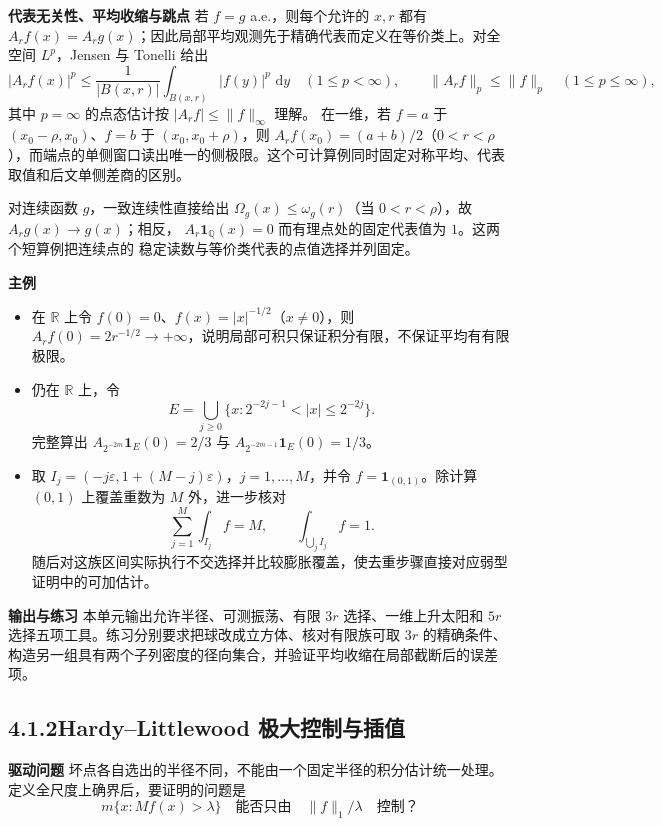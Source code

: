 \documentclass[11pt,a4paper]{ctexart}
\newcommand{\R}{\mathbb R}
\newcommand{\eps}{\varepsilon}
\newcommand{\dd}{\,\mathrm d}
\newcommand{\planitem}[1]{\par\smallskip\noindent\textcolor{deepblue}{\textbf{#1}}\quad}
\newcommand{\unithead}[2]{\subsection{#1\quad #2}}
\begin{document}
\planitem{代表无关性、平均收缩与跳点}
若 $f=g$ a.e.，则每个允许的 $x,r$ 都有 $A_rf(x)=A_rg(x)$；因此局部平均观测先于精确代表而定义在等价类上。对全空间 $L^p$，Jensen 与 Tonelli 给出
\[
 |A_rf(x)|^p\le\frac1{|B(x,r)|}\int_{B(x,r)}|f(y)|^p\,\dd y
 \quad(1\le p<\infty),
 \qquad \|A_rf\|_p\le\|f\|_p\quad(1\le p\le\infty),
\]
其中 $p=\infty$ 的点态估计按 $|A_rf|\le\|f\|_\infty$ 理解。
在一维，若 $f=a$ 于 $(x_0-\rho,x_0)$、$f=b$ 于 $(x_0,x_0+\rho)$，则
$A_rf(x_0)=(a+b)/2$（$0<r<\rho$），而端点的单侧窗口读出唯一的侧极限。这个可计算例同时固定对称平均、代表取值和后文单侧差商的区别。

对连续函数 $g$，一致连续性直接给出
$\Omega_g(x)\le\omega_g(r)$（当 $0<r<\rho$），故 $A_rg(x)\to g(x)$；相反，
$A_r\mathbf1_{\mathbb Q}(x)=0$ 而有理点处的固定代表值为 $1$。这两个短算例把连续点的
稳定读数与等价类代表的点值选择并列固定。

\planitem{主例}
\begin{itemize}
\item 在 $\R$ 上令 $f(0)=0$、$f(x)=|x|^{-1/2}$（$x\ne0$），则 $A_rf(0)=2r^{-1/2}\to+\infty$，说明局部可积只保证积分有限，不保证平均有有限极限。
\item 仍在 $\R$ 上，令
\[
E=\bigcup_{j\ge0}\{x:2^{-2j-1}<|x|\le2^{-2j}\}.
\]
完整算出 $A_{2^{-2m}}\mathbf1_E(0)=2/3$ 与 $A_{2^{-2m-1}}\mathbf1_E(0)=1/3$。
\item 取 $I_j=(-j\eps,1+(M-j)\eps)$，$j=1,\ldots,M$，并令 $f=\mathbf1_{(0,1)}$。除计算 $(0,1)$ 上覆盖重数为 $M$ 外，进一步核对
\[
\sum_{j=1}^M\int_{I_j}f=M,
\qquad
\int_{\bigcup_jI_j}f=1.
\]
随后对这族区间实际执行不交选择并比较膨胀覆盖，使去重步骤直接对应弱型证明中的可加估计。
\end{itemize}

\planitem{输出与练习}
本单元输出允许半径、可测振荡、有限 $3r$ 选择、一维上升太阳和 $5r$ 选择五项工具。练习分别要求把球改成立方体、核对有限族可取 $3r$ 的精确条件、构造另一组具有两个子列密度的径向集合，并验证平均收缩在局部截断后的误差项。

\unithead{4.1.2}{Hardy--Littlewood 极大控制与插值}

\planitem{驱动问题}
坏点各自选出的半径不同，不能由一个固定半径的积分估计统一处理。定义全尺度上确界后，要证明的问题是
\[
m\{x:Mf(x)>\lambda\}\quad\text{能否只由}\quad \|f\|_1/\lambda
\quad\text{控制？}
\]
\end{document}
